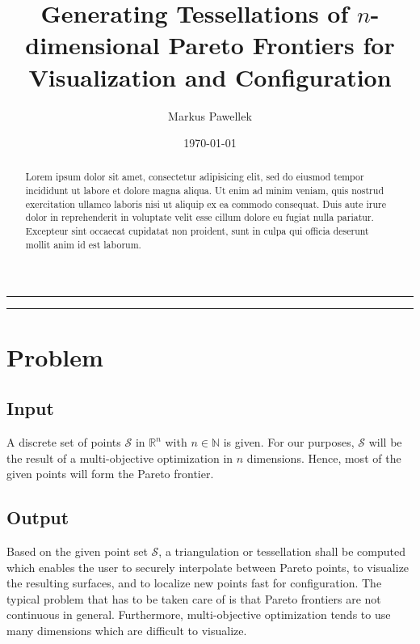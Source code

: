 \documentclass[10pt, twoside]{article}
\title{Generating Tessellations of $n$-dimensional Pareto Frontiers for Visualization and Configuration}
\author{Markus Pawellek}
\date{\today}
\newcommand{\naturalnumbers}{\mathds{N}}
\newcommand{\realnumbers}{\mathds{R}}
\begin{document}
  \maketitle

  \bigskip
  \hrule
  \smallskip
  \begin{abstract}
    Lorem ipsum dolor sit amet, consectetur adipisicing elit, sed do eiusmod
    tempor incididunt ut labore et dolore magna aliqua. Ut enim ad minim veniam,
    quis nostrud exercitation ullamco laboris nisi ut aliquip ex ea commodo
    consequat. Duis aute irure dolor in reprehenderit in voluptate velit esse
    cillum dolore eu fugiat nulla pariatur. Excepteur sint occaecat cupidatat non
    proident, sunt in culpa qui officia deserunt mollit anim id est laborum.
  \end{abstract}
  \medskip
  \hrule
  \bigskip

  \tableofcontents
  \cleardoublepage

  \section{Problem} %
  \label{sec:problem}
    \subsection{Input} %
    \label{sub:input}
      A discrete set of points $\mathcal{S}$ in $\realnumbers^n$ with $n\in\naturalnumbers$ is given.
      For our purposes, $\mathcal{S}$ will be the result of a multi-objective optimization in $n$ dimensions.
      Hence, most of the given points will form the Pareto frontier.

    \subsection{Output} %
    \label{sub:output}
      Based on the given point set $\mathcal{S}$, a triangulation or tessellation shall be computed which enables the user to securely interpolate between Pareto points, to visualize the resulting surfaces, and to localize new points fast for configuration.
      The typical problem that has to be taken care of is that Pareto frontiers are not continuous in general.
      Furthermore, multi-objective optimization tends to use many dimensions which are difficult to visualize.
\end{document}
